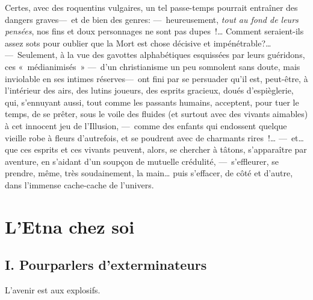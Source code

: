 \documentclass[french,twoside]{book} %
\newcommand{\salute}[1]{\bigbreak{#1}\par\medbreak}
\begin{document}
Certes, avec des roquentins vulgaires, un tel passe-temps pourrait entraîner des dangers graves— et de bien des genres: — heureusement, \emph{tout au fond de leurs pensées}, nos fins et doux personnages ne sont pas dupes !… Comment seraient-ils assez sots pour oublier que la Mort est chose décisive et impénétrable?… — Seulement, à la vue des gavottes alphabétiques esquissées par leurs guéridons, ces « médianimisés » — d’un christianisme un peu somnolent sans doute, mais inviolable en ses intimes réserves— ont fini par se persuader qu’il est, peut-être, à l’intérieur des airs, des lutins joueurs, des esprits gracieux, doués d’espièglerie, qui, s’ennuyant aussi, tout comme les passants humains, acceptent, pour tuer le temps, de se prêter, sous le voile des fluides   (et surtout avec des vivants aimables) à cet innocent jeu de l’Illusion, — comme des enfants qui endossent quelque vieille robe à fleurs d’autrefois, et se poudrent avec de charmants rires !… — et… que ces esprits et ces vivants peuvent, alors, se chercher à tâtons, s’apparaître par aventure, en s’aidant d’un soupçon de mutuelle crédulité, — s’effleurer, se prendre, même, très soudainement, la main… puis s’effacer, de côté et d’autre, dans l’immense cache-cache de l’univers.
 \section[{L’Etna chez soi}]{L’Etna chez soi}\renewcommand{\leftmark}{L’Etna chez soi}


\salute{Aux mauvais riches}
\subsection[{I. Pourparlers d’exterminateurs}]{I. Pourparlers d’exterminateurs}
\noindent L’avenir est aux explosifs.\par
\end{document}
